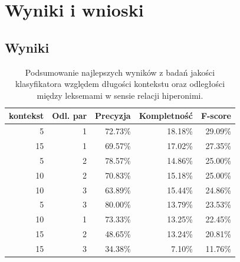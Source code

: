\documentclass[a4paper,10pt]{report}
\begin{document}
\chapter{Wyniki i wnioski}

\section{Wyniki}

\begin{table}[htp]
  \centering
    \begin{tabular}{rrrrr}
    \toprule
    \multicolumn{1}{c}{kontekst} & \multicolumn{1}{c}{Odl. par} & \multicolumn{1}{c}{Precyzja} & \multicolumn{1}{c}{Kompletność} & \multicolumn{1}{c}{F-score} \\
    \midrule
    5     & 1     & 72.73\% & 18.18\% & 29.09\% \\
    15    & 1     & 69.57\% & 17.02\% & 27.35\% \\
    5     & 2     & 78.57\% & 14.86\% & 25.00\% \\
    10    & 2     & 70.83\% & 15.18\% & 25.00\% \\
    10    & 3     & 63.89\% & 15.44\% & 24.86\% \\
    5     & 3     & 80.00\% & 13.79\% & 23.53\% \\
    10    & 1     & 73.33\% & 13.25\% & 22.45\% \\
    15    & 2     & 48.65\% & 13.24\% & 20.81\% \\
    15    & 3     & 34.38\% & 7.10\% & 11.76\% \\
    \bottomrule
    \end{tabular}%
    \caption{Podsumowanie najlepszych wyników z badań jakości klasyfikatora względem długości kontekstu oraz odległości między leksemami w sensie relacji hiperonimi.}
  \label{tab:wyniki-podsum}%
\end{table}%
\end{document}
